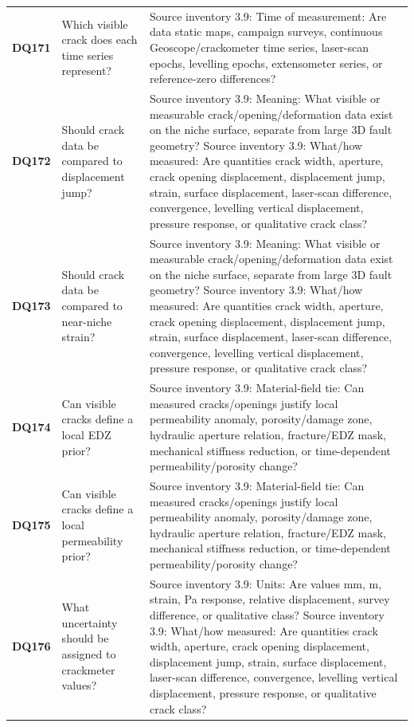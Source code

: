 \begin{longtable}{@{}L{0.09\textwidth} L{0.31\textwidth} L{0.52\textwidth}@{}}
\addlinespace[0.18em]
\textbf{DQ171} & Which visible crack does each time series represent? & Source inventory 3.9: Time of measurement: Are data static maps, campaign surveys, continuous Geoscope/crackometer time series, laser-scan epochs, levelling epochs, extensometer series, or reference-zero differences?\\
\addlinespace[0.18em]
\textbf{DQ172} & Should crack data be compared to displacement jump? & Source inventory 3.9: Meaning: What visible or measurable crack/opening/deformation data exist on the niche surface, separate from large 3D fault geometry? Source inventory 3.9: What/how measured: Are quantities crack width, aperture, crack opening displacement, displacement jump, strain, surface displacement, laser-scan difference, convergence, levelling vertical displacement, pressure response, or qualitative crack class?\\
\addlinespace[0.18em]
\textbf{DQ173} & Should crack data be compared to near-niche strain? & Source inventory 3.9: Meaning: What visible or measurable crack/opening/deformation data exist on the niche surface, separate from large 3D fault geometry? Source inventory 3.9: What/how measured: Are quantities crack width, aperture, crack opening displacement, displacement jump, strain, surface displacement, laser-scan difference, convergence, levelling vertical displacement, pressure response, or qualitative crack class?\\
\addlinespace[0.18em]
\textbf{DQ174} & Can visible cracks define a local EDZ prior? & Source inventory 3.9: Material-field tie: Can measured cracks/openings justify local permeability anomaly, porosity/damage zone, hydraulic aperture relation, fracture/EDZ mask, mechanical stiffness reduction, or time-dependent permeability/porosity change?\\
\addlinespace[0.18em]
\textbf{DQ175} & Can visible cracks define a local permeability prior? & Source inventory 3.9: Material-field tie: Can measured cracks/openings justify local permeability anomaly, porosity/damage zone, hydraulic aperture relation, fracture/EDZ mask, mechanical stiffness reduction, or time-dependent permeability/porosity change?\\
\addlinespace[0.18em]
\textbf{DQ176} & What uncertainty should be assigned to crackmeter values? & Source inventory 3.9: Units: Are values mm, m, strain, Pa response, relative displacement, survey difference, or qualitative class? Source inventory 3.9: What/how measured: Are quantities crack width, aperture, crack opening displacement, displacement jump, strain, surface displacement, laser-scan difference, convergence, levelling vertical displacement, pressure response, or qualitative crack class?\\

\end{longtable}
